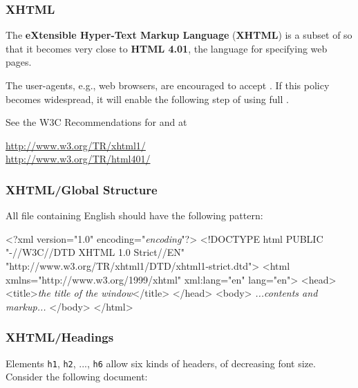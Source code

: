 
%
\begin{frame}
\frametitle{XHTML}

The \textbf{eXtensible Hyper-Text Markup Language}
(\textbf{\textsf{XHTML}}) is a subset of \XML so that it becomes very
close to \textbf{\textsf{HTML 4.01}}, the language for specifying web
pages.

\bigskip

The user-agents, e.g., web browsers, are encouraged to accept
\XHTML. If this policy becomes widespread, it will enable the
following step of using full \XML.

\bigskip

See the W3C Recommendations for \XHTML and \HTML at
\begin{center}
\url{http://www.w3.org/TR/xhtml1/}\\
\url{http://www.w3.org/TR/html401/}
\end{center}

\end{frame}

%
\begin{frame}[containsverbatim]
\frametitle{XHTML/Global Structure}

All \XHTML file containing English should have the following pattern:
{\small
\begin{semiverbatim}
<?xml version="1.0" encoding="\emph{encoding}"?>
<!DOCTYPE html
    PUBLIC "-//W3C//DTD XHTML 1.0 Strict//EN"
    "http://www.w3.org/TR/xhtml1/DTD/xhtml1-strict.dtd">
<html xmlns="http://www.w3.org/1999/xhtml"
      xml:lang="en" lang="en">
  <head>
    <title>\textit{the title of the window}</title>
  </head>
  <body>
     \emph{...contents and markup...}
  </body>
</html>
\end{semiverbatim}
}

\end{frame}

%
\begin{frame}
\frametitle{XHTML/Headings}

Elements \texttt{h1}, \texttt{h2}, ..., \texttt{h6} allow six kinds of
headers, of decreasing font size. Consider the following document:

\end{frame}

